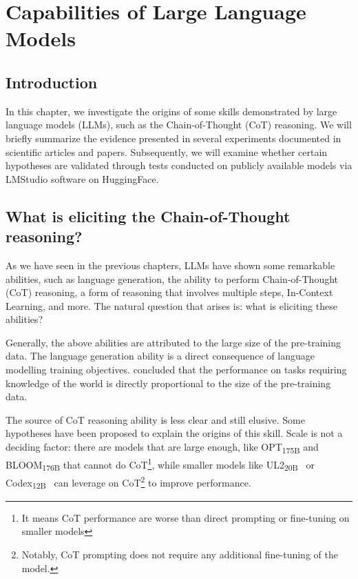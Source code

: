 
\chapter{Capabilities of Large Language Models}
\label{ch:capabilities}

\section{Introduction}
\label{sec:ch4-introduction}

In this chapter, we investigate the origins of some skills demonstrated by large language models (LLMs), such as the Chain-of-Thought (CoT) reasoning.
We will briefly summarize the evidence presented in several experiments documented in scientific articles and papers.
Subsequently, we will examine whether certain hypotheses are validated through tests conducted on publicly available models via LMStudio software on HuggingFace.

\section{What is eliciting the Chain-of-Thought reasoning?}
\label{sec:what-is-eliciting-the-chain-of-thought-reasoning?}

As we have seen in the previous chapters, LLMs have shown some remarkable abilities, such as language generation, the ability to perform Chain-of-Thought (CoT) reasoning, a form of reasoning that involves multiple steps, In-Context Learning, and more.
The natural question that arises is: what is eliciting these abilities?

Generally, the above abilities are attributed to the large size of the pre-training data.
The language generation ability is a direct consequence of language modelling training objectives.
\textcite{liang2022holistic} concluded that the performance on tasks requiring knowledge of the world is directly proportional to the size of the pre-training data.

The source of CoT reasoning ability is less clear and still elusive.
Some hypotheses have been proposed to explain the origins of this skill.
Scale is not a deciding factor: there are models that are large enough, like OPT\textsubscript{175B} and BLOOM\textsubscript{176B} that cannot do CoT\footnote{It means CoT performance are worse than direct prompting or fine-tuning on smaller models}, while smaller models like UL2\textsubscript{20B}~\cite{tay2023ul2unifyinglanguagelearning} or Codex\textsubscript{12B}~\cite{chen2021evaluating} can leverage on CoT\footnote{Notably, CoT prompting does not require any additional fine-tuning of the model.} to improve performance.

